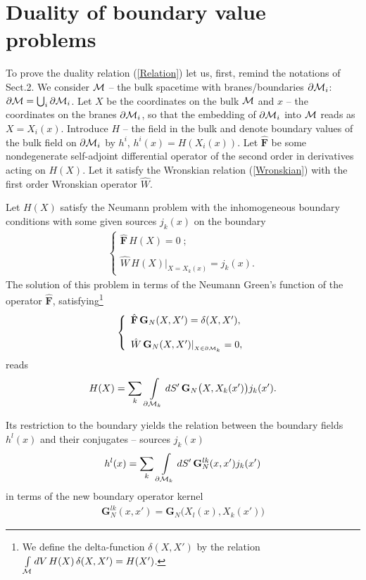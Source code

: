 \documentclass[a4paper,12pt]{article}
\newcommand{\M}{{\cal M}}
\newcommand{\dM}{{\partial \cal M}}
\newcommand{\BBox}{\hat{\mathbf{F}}}  %
\newcommand{\GrN}{ \mathbf{G}_{N}}  %
\newcommand{\dV}{dV\,}
\newcommand{\dS}{dS}
\begin{document}
\section{Duality of boundary value problems}
\renewcommand{\M}{{\cal M}}
\renewcommand{\dM}{{\partial \cal M}}
\hspace{\parindent}To prove the duality relation (\ref{Relation})
let us, first, remind the notations of Sect.2. We consider $\M$ --
the bulk spacetime with branes/boundaries $\dM_i$:
$\dM=\bigcup_i\dM_i$. Let $X$ be the coordinates on the bulk $\M$
and $x$ -- the coordinates on the branes $\dM_i$, so that the
embedding of $\dM_i$ into $\M$ reads as $X=X_i(x)$. Introduce $H$
-- the field in the bulk and denote boundary values of the bulk
field on $\dM_i$ by $h^i$, $h^i(x)=H(X_i(x))$. Let $\BBox$ be some
nondegenerate self-adjoint differential operator of the second
order in derivatives acting on $H(X)$. Let it satisfy the
Wronskian relation (\ref{Wronskian}) with the first order
Wronskian operator $\hat W$.

Let $H(X)$ satisfy the Neumann problem with the inhomogeneous
boundary conditions with some given sources $j_k(x)$ on the
boundary
    \begin{eqnarray}
     \left\{ \begin{array}{l}
     \BBox\,H(X)=0\;; \\
      \\
     \hat W \,H(X) |_{X=X_k(x)}=j_k(x).
     \end{array} \right.                      \label{Nbvp}
    \end{eqnarray}
The solution of this problem in terms of the Neumann Green's
function of the operator $\BBox$, satisfying\footnote{We define
the delta-function $\delta(X,X')$ by the relation
$\int\limits_{\M} \dV H(X)\,\delta(X,X')=H(X')$.}
    \begin{eqnarray}
     \left\{ \begin{array}{l}
     \BBox \,\GrN(X,X')=\delta(X,X'), \\
    \\
     \hat W \,\GrN(X,X')|_{_{X\in\dM_k}}=0,
     \end{array} \right.                    \label{NGfbvp}
    \end{eqnarray}
reads
    \begin{eqnarray}
     H(X)=\sum_k\,\int
     \limits_{\dM_k}\dS'\,
    \GrN\big(X,X_k(x')\big)j_k(x').  \label{NGenSol}
    \end{eqnarray}

Its restriction to the boundary yields the relation between the
boundary fields $h^l(x)$ and their conjugates -- sources $j_k(x)$
        \begin{eqnarray}
         h^l(x)=\sum_k\,
         \int\limits_{\dM_k}\dS'\,
         {\mathbf G}^{lk}_N(x,x')j_k(x')   \label{N}
        \end{eqnarray}
in terms of the new boundary operator kernel
        \begin{eqnarray}
        {\mathbf G}^{lk}_N(x,x')=
         \GrN\big(X_l(x),X_k(x')\big)   \label{N kernel}
        \end{eqnarray}
\end{document}
